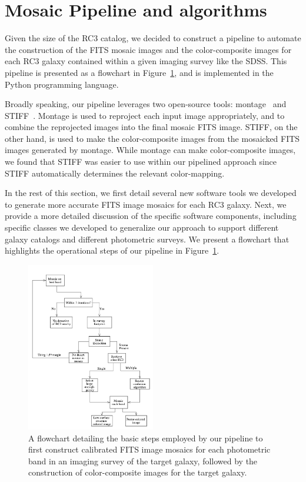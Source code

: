 \documentclass[authoryear, 12pt, 5p, times]{elsarticle}
\begin{document}
\section{Mosaic Pipeline and algorithms\label{mosaic-sec}}
Given the size of the RC3 catalog, we decided to construct a pipeline to automate the construction of the FITS mosaic images and the color-composite images for each RC3 galaxy contained within a given imaging survey like the SDSS. This pipeline is presented as a flowchart in Figure~\ref{flowchart}, and is implemented in the Python programming language.

Broadly speaking, our pipeline leverages two open-source tools: montage~\citep{montage} and  STIFF~\citep{stiff}. Montage is used to reproject each input image appropriately, and to combine the reprojected images into the final mosaic FITS image. STIFF, on the other hand, is used to make the color-composite images from the mosaicked FITS images generated by montage. While montage can make color-composite images, we found that STIFF was easier to use within our pipelined approach since STIFF automatically determines the relevant color-mapping.

In the rest of this section, we first detail several new software tools we developed to generate more accurate FITS image mosaics for each RC3 galaxy. Next, we provide a more detailed discussion of the specific software components, including specific classes we developed to generalize our approach to support different galaxy catalogs and different photometric surveys. We present a flowchart that highlights the operational steps of our pipeline in Figure~\ref{flowchart}.

\begin{figure}[h]
\includegraphics[width=0.5\textwidth]{figures/algorithm.png}
\caption{A flowchart detailing the basic steps employed by our pipeline to first construct calibrated FITS image mosaics for each photometric band in an imaging survey of the target galaxy, followed by the construction of color-composite images for the target galaxy.}
\label{flowchart}
\end{figure}
\end{document}
